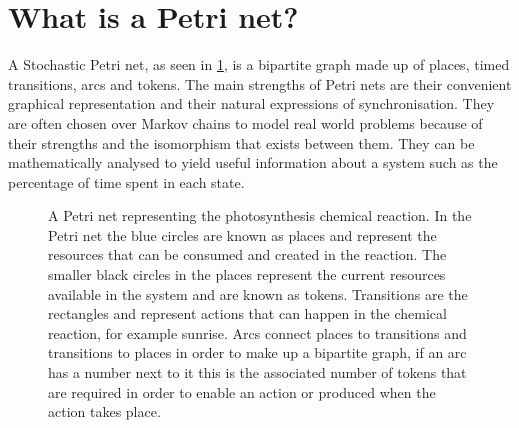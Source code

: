 \section{What is a Petri net?}
A Stochastic Petri net,  as seen in \cref{tikz:photo}, is a bipartite graph made up of places, timed transitions, arcs and tokens. The main strengths of Petri nets are their convenient graphical representation and their natural expressions of synchronisation. They are often chosen over Markov chains to model real world problems because of their strengths and the isomorphism that exists between them. They can be mathematically analysed to yield useful information about a system such as the percentage of time spent in each state.


\begin{figure}[tb]

\caption{A Petri net representing the photosynthesis chemical reaction. In the Petri net the blue circles are known as places and represent the resources that can be consumed and created in the reaction. The smaller black circles in the places represent the current resources available in the system and are known as tokens. Transitions are the rectangles and represent actions that can happen in the chemical reaction, for example sunrise. Arcs connect places to transitions and transitions to places in order to make up a bipartite graph, if an arc has a number next to it this is the associated number of tokens that are required in order to enable an action or produced when the action takes place.}
\label{tikz:photo}
\end{figure}